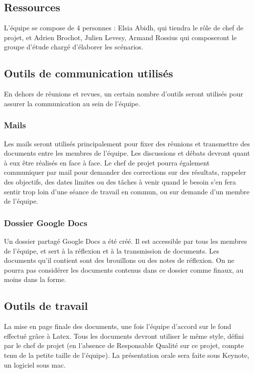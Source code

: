 \subsection{Ressources}
L'équipe se compose de 4 personnes : Elsia Abidh, qui tiendra le rôle de chef de projet, et Adrien Brochot, Julien Levesy, Armand Rossius qui composeront le groupe d'étude chargé d'élaborer les scénarios.
\subsection{Outils de communication utilisés}
En dehors de réunions et revues, un certain nombre d'outils seront utilisés pour assurer la communication au sein de l'équipe.

\subsubsection{Mails}
Les mails seront utilisés principalement pour fixer des réunions et transmettre des documents entre les membres de l'équipe. Les discussions et débats devront quant à eux être réalisés en face à face. Le chef de projet pourra également communiquer par mail pour demander des corrections sur des résultats, rappeler des objectifs, des dates limites ou des tâches à venir quand le besoin s'en fera sentir trop loin d'une séance de travail en commun, ou sur demande d'un membre de l'équipe.

\subsubsection{Dossier Google Docs}
Un dossier partagé Google Docs a été créé. Il est accessible par tous les membres de l'équipe, et sert à la réflexion et à la transmission de documents. Les documents qu'il contient sont des brouillons ou des notes de réflexion. On ne pourra pas considérer les documents contenus dans ce dossier comme finaux, au moins dans la forme.

\subsection{Outils de travail}
La mise en page finale des documents, une fois l'équipe d'accord sur le fond effectué grâce à Latex. 
Tous les documents devront utiliser le même style, défini par
le chef de projet (en l'absence de Responsable Qualité sur ce projet, compte tenu de la petite taille de l'équipe). La présentation orale sera faite sous Keynote, un logiciel sous mac.